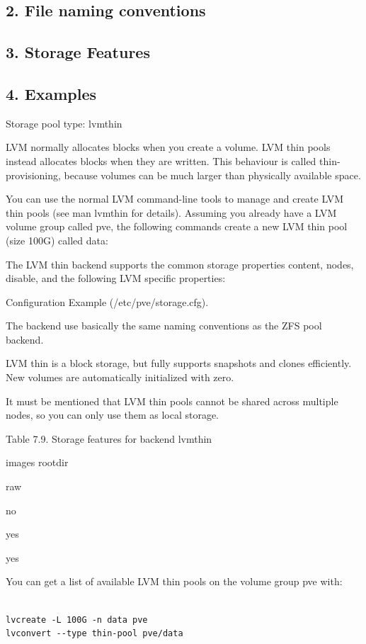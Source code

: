 \subsection{2. File naming conventions}

\subsection{3. Storage Features}

\subsection{4. Examples}

Storage pool type: lvmthin

LVM normally allocates blocks when you create a volume. LVM thin pools instead allocates blocks when they are written. This behaviour is called thin-provisioning, because volumes can be much larger than physically available space.

You can use the normal LVM command-line tools to manage and create LVM thin pools (see man lvmthin for details). Assuming you already have a LVM volume group called pve, the following commands create a new LVM thin pool (size 100G) called data:

The LVM thin backend supports the common storage properties content, nodes, disable, and the following LVM specific properties:

Configuration Example (/etc/pve/storage.cfg).

The backend use basically the same naming conventions as the ZFS pool backend.

LVM thin is a block storage, but fully supports snapshots and clones efficiently. New volumes are automatically initialized with zero.

It must be mentioned that LVM thin pools cannot be shared across multiple nodes, so you can only use them as local storage.

Table 7.9. Storage features for backend lvmthin

images rootdir

raw

no

yes

yes

You can get a list of available LVM thin pools on the volume group pve with:

\begin{lstlisting}

lvcreate -L 100G -n data pve
lvconvert --type thin-pool pve/data

\end{lstlisting}

